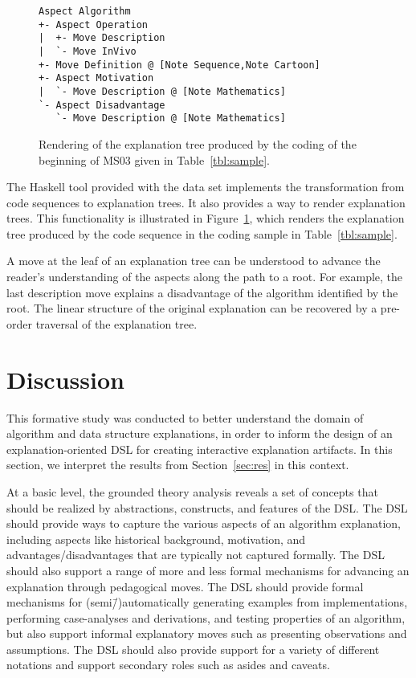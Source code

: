 \documentclass[sigconf]{acmart}
\begin{document}
\begin{figure}
\begin{Verbatim}[fontsize=\small,xleftmargin=2ex]
Aspect Algorithm
+- Aspect Operation
|  +- Move Description
|  `- Move InVivo
+- Move Definition @ [Note Sequence,Note Cartoon]
+- Aspect Motivation
|  `- Move Description @ [Note Mathematics]
`- Aspect Disadvantage
   `- Move Description @ [Note Mathematics]
\end{Verbatim}
\caption{Rendering of the explanation tree produced by the coding of the
beginning of MS03 given in Table~\ref{tbl:sample}.}
\label{fig:tree}
\end{figure}


The Haskell tool provided with the data set implements the transformation from
code sequences to explanation trees. It also provides a way to render
explanation trees. This functionality is illustrated in Figure~\ref{fig:tree},
which renders the explanation tree produced by the code sequence in the coding
sample in Table~\ref{tbl:sample}.


A move at the leaf of an explanation tree can be understood to advance the
reader's understanding of the aspects along the path to a root. For example,
the last description move explains a disadvantage of the algorithm identified
by the root.
%
The linear structure of the original explanation can be recovered by a
pre-order traversal of the explanation tree. 


\section{Discussion}
\label{sec:dis}

This formative study was conducted to better understand the domain of algorithm
and data structure explanations, in order to inform the design of an
explanation-oriented DSL for creating interactive explanation artifacts. In
this section, we interpret the results from Section~\ref{sec:res} in this
context.


At a basic level, the grounded theory analysis reveals a set of concepts that
should be realized by abstractions, constructs, and features of the DSL.
%
The DSL should provide ways to capture the various aspects of an algorithm
explanation, including aspects like historical background, motivation, and
advantages/disadvantages that are typically not captured formally.
%
The DSL should also support a range of more and less formal mechanisms for
advancing an explanation through pedagogical moves. The DSL should provide
formal mechanisms for (semi\=/)automatically generating examples from
implementations, performing case-analyses and derivations, and testing
properties of an algorithm, but also support informal explanatory moves such as
presenting observations and assumptions.
%
The DSL should also provide support for a variety of different notations and
support secondary roles such as asides and caveats.
\end{document}
